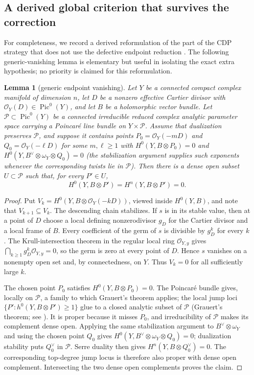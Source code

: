 \documentclass[11pt]{amsart}
\newcommand{\cO}{\mathcal O}
\newcommand{\Pic}{\operatorname{Pic}}
\theoremstyle{plain}
\newtheorem{lemma}[theorem]{Lemma}
\theoremstyle{definition}
\theoremstyle{remark}
\begin{document}
\subsection{A derived global criterion that survives the correction}

For completeness, we record a derived reformulation of the part of the CDP
strategy that does not use the defective endpoint reduction
\cite[Prop.~2.4]{CDP2020}.  The following generic-vanishing lemma is
elementary but useful in isolating the exact extra hypothesis; no priority is
claimed for this reformulation.

\begin{lemma}[generic endpoint vanishing]
\label{lem:generic-endpoints}
Let $Y$ be a connected compact complex manifold of dimension $n$, let $D$ be
a nonzero effective Cartier divisor with $\cO_Y(D)\in\Pic^0(Y)$, and let
$B$ be a holomorphic vector bundle.  Let $\mathcal P\subset\Pic^0(Y)$ be a
connected irreducible reduced complex analytic parameter space carrying a
Poincar\'e line bundle on $Y\times\mathcal P$.  Assume that dualization
preserves $\mathcal P$, and suppose it
  contains points $P_0=\cO_Y(-mD)$ and $Q_0=\cO_Y(-\ell D)$ for some
  $m,\ell\ge1$ with
  $H^0(Y,B\otimes P_0)=0$ and
  $H^0(Y,B^\vee\otimes\omega_Y\otimes Q_0)=0$ (the stabilization argument
  supplies such exponents whenever the corresponding twists lie in
  $\mathcal P$).  Then there is a dense open subset
$U\subset\mathcal P$ such that, for every $P'\in U$,
\[
 H^0(Y,B\otimes P')=H^n(Y,B\otimes P')=0.
 \tag{5.2}
\]
\end{lemma}

\begin{proof}
Put
  \(V_k=H^0(Y,B\otimes\cO_Y(-kD))\), viewed inside $H^0(Y,B)$, and note
  that $V_{k+1}\subseteq V_k$.  The descending chain stabilizes.  If $s$ is
  in its stable value, then at a point of $D$ choose a local defining
  nonzerodivisor $g_D$ for the Cartier divisor and a local frame of $B$.
  Every coefficient of the germ of $s$ is divisible by $g_D^k$ for every
  $k$.  The Krull-intersection theorem in the regular local ring
  $\cO_{Y,y}$ gives $\bigcap_{k\ge1}g_D^k\cO_{Y,y}=0$, so the germ is zero at
  every point of $D$.  Hence $s$ vanishes on a nonempty open set and, by
  connectedness, on $Y$.  Thus $V_k=0$ for all sufficiently large $k$.

  The chosen point $P_0$ satisfies
  $H^0(Y,B\otimes P_0)=0$.  The Poincar\'e bundle gives, locally on
$\mathcal P$, a family to which Grauert's theorem applies; the local jump
  loci $\{P':h^0(Y,B\otimes P')\ge1\}$ glue to a closed analytic subset of
  $\mathcal P$ (Grauert's theorem; see \cite{GrRe,BaSt}).  It is proper because it misses $P_0$, and irreducibility of
$\mathcal P$ makes its complement dense open.  Applying the same stabilization
argument to $B^\vee\otimes\omega_Y$ and using the chosen point $Q_0$ gives
$H^0(Y,B^\vee\otimes\omega_Y\otimes Q_0)=0$; dualization stability puts
$Q_0^\vee$ in $\mathcal P$.  Serre duality then gives
$H^n(Y,B\otimes Q_0^\vee)=0$.  The corresponding top-degree jump locus is
therefore also proper with dense open complement.  Intersecting the two
dense open complements proves the claim.
\end{proof}
\end{document}
